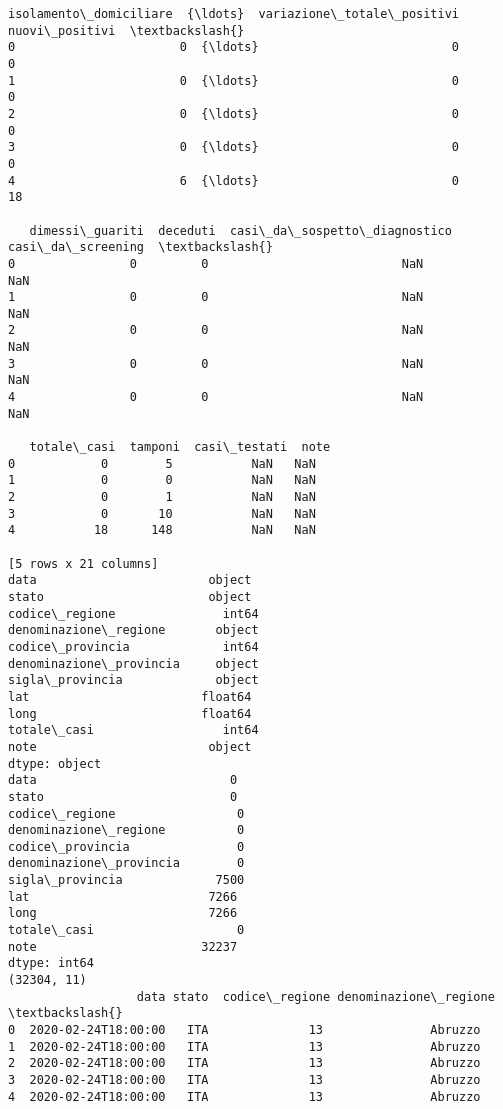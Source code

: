 \documentclass[11pt]{article}
\begin{document}
\begin{Verbatim}[commandchars=\\\{\}]
   isolamento\_domiciliare  {\ldots}  variazione\_totale\_positivi  nuovi\_positivi  \textbackslash{}
0                       0  {\ldots}                           0               0
1                       0  {\ldots}                           0               0
2                       0  {\ldots}                           0               0
3                       0  {\ldots}                           0               0
4                       6  {\ldots}                           0              18

   dimessi\_guariti  deceduti  casi\_da\_sospetto\_diagnostico  casi\_da\_screening  \textbackslash{}
0                0         0                           NaN                NaN
1                0         0                           NaN                NaN
2                0         0                           NaN                NaN
3                0         0                           NaN                NaN
4                0         0                           NaN                NaN

   totale\_casi  tamponi  casi\_testati  note
0            0        5           NaN   NaN
1            0        0           NaN   NaN
2            0        1           NaN   NaN
3            0       10           NaN   NaN
4           18      148           NaN   NaN

[5 rows x 21 columns]
data                        object
stato                       object
codice\_regione               int64
denominazione\_regione       object
codice\_provincia             int64
denominazione\_provincia     object
sigla\_provincia             object
lat                        float64
long                       float64
totale\_casi                  int64
note                        object
dtype: object
data                           0
stato                          0
codice\_regione                 0
denominazione\_regione          0
codice\_provincia               0
denominazione\_provincia        0
sigla\_provincia             7500
lat                         7266
long                        7266
totale\_casi                    0
note                       32237
dtype: int64
(32304, 11)
                  data stato  codice\_regione denominazione\_regione  \textbackslash{}
0  2020-02-24T18:00:00   ITA              13               Abruzzo
1  2020-02-24T18:00:00   ITA              13               Abruzzo
2  2020-02-24T18:00:00   ITA              13               Abruzzo
3  2020-02-24T18:00:00   ITA              13               Abruzzo
4  2020-02-24T18:00:00   ITA              13               Abruzzo


\end{Verbatim}
\end{document}
